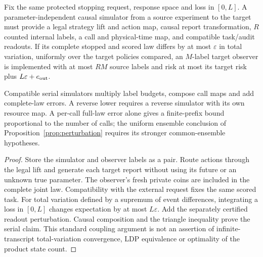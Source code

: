 \begin{proposition}\label{prop:morphism}
Fix the same protected stopping request, response space and loss in $[0,L]$. A parameter-independent causal simulator from a source experiment to the target must provide a legal strategy lift and action map, causal report transformation, $R$ counted internal labels, a call and physical-time map, and compatible task/audit readouts. If its complete stopped and scored law differs by at most $\varepsilon$ in total variation, uniformly over the target policies compared, an $M$-label target observer is implemented with at most $RM$ source labels and risk at most its target risk plus $L\varepsilon+e_{\rm out}$.

Compatible serial simulators multiply label budgets, compose call maps and add complete-law errors. A reverse lower requires a reverse simulator with its own resource map. A per-call full-law error alone gives a finite-prefix bound proportional to the number of calls; the uniform ensemble conclusion of Proposition~\ref{prop:perturbation} requires its stronger common-ensemble hypotheses.
\end{proposition}
\begin{proof}
Store the simulator and observer labels as a pair. Route actions through the legal lift and generate each target report without using its future or an unknown true parameter. The observer's fresh private coins are included in the complete joint law. Compatibility with the external request fixes the same scored task. For total variation defined by a supremum of event differences, integrating a loss in $[0,L]$ changes expectation by at most $L\varepsilon$. Add the separately certified readout perturbation. Causal composition and the triangle inequality prove the serial claim. This standard coupling argument is not an assertion of infinite-transcript total-variation convergence, LDP equivalence or optimality of the product state count.
\end{proof}

